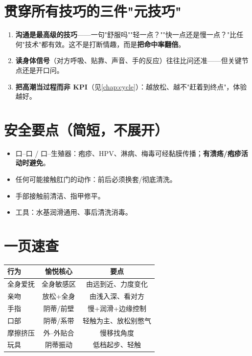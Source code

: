 \documentclass[12pt,UTF8,openany]{ctexbook}
\begin{document}
\section{贯穿所有技巧的三件"元技巧"}

\begin{enumerate}[leftmargin=2em,itemsep=0.3em]
  \item \textbf{沟通是最高级的技巧}——一句"舒服吗""轻一点？""快一点还是慢一点？"比任何"技术"都有效。这不是打断情趣，而是\textbf{把命中率翻倍}。
  \item \textbf{读身体信号}（对方呼吸、贴靠、声音、手的反应）往往比问还准——但关键节点还是开口问。
  \item \textbf{把高潮当过程而非 KPI}（见\ref{chap:cycle}）：越放松、越不"赶着到终点"，体验越好。
\end{enumerate}

\section{安全要点（简短，不展开）}

\begin{itemize}[leftmargin=2em,itemsep=0.3em]
  \item 口--口 / 口--生殖器：疱疹、HPV、淋病、梅毒可经黏膜传播；\textbf{有溃疡/疱疹活动时避免}。
  \item 任何可能接触肛门的动作：前后必须换套/彻底清洗。
  \item 手部接触前清洁、指甲修平。
  \item 工具：水基润滑通用、事后清洗消毒。
\end{itemize}

\section{一页速查}

\begin{tabularx}{\textwidth}{lCC}
\toprule
行为 & 愉悦核心 & 要点 \\
\midrule
全身爱抚 & 全身敏感区 & 由远到近、力度变化 \\
亲吻 & 放松+全身 & 由浅入深、看对方 \\
手指 & 阴蒂/前壁 & 慢+润滑+边缘控制 \\
口部 & 阴蒂/系带 & 轻触为主、放松别憋气 \\
摩擦挤压 & 外--外贴合 & 慢移找角度 \\
玩具 & 阴蒂振动 & 低档起步、轻触 \\
\bottomrule
\end{tabularx}
\end{document}
